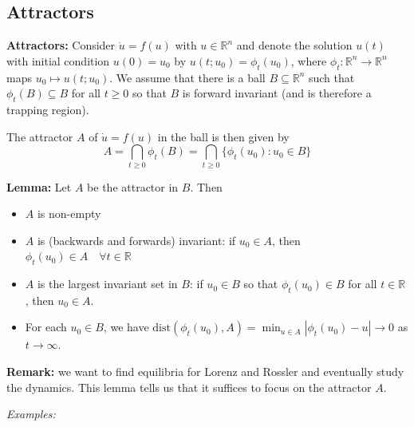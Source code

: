 \documentclass[12pt]{report}
\newcommand{\R}{\mathbb{R}}
\newcommand{\abs}[1]{\left\vert #1 \right\vert}
\newcommand{\sub}{\subseteq}
\newcommand*{\tbf}[1]{\ifmmode\mathbf{#1}\else\textbf{#1}\fi}
\newenvironment{proposition}[1][gray]{
\begin{tcolorbox}[
    parbox=false,
    colback=#1!5!white,
    colframe=#1!75!black,
    breakable
]}
{\end{tcolorbox}}
\begin{document}
\subsection{Attractors}
\tbf{Attractors:} Consider $\dot u = f(u)$ with $u \in \R^n$ and denote the solution $u(t)$ with initial condition $u(0) = u_0$ by $u(t; u_0) = \phi_t(u_0)$, where $\phi_t: \R^n \to \R^n$ maps $u_0 \mapsto u(t; u_0)$. We assume that there is a ball $B \sub \R^n$ such that $\phi_t(B) \sub B$ for all $t \geq 0$ so that $B$ is forward invariant (and is therefore a trapping region).

The attractor $A$ of $\dot u = f(u)$ in the ball is then given by
\[A = \bigcap_{t \geq 0} \phi_t(B) = \bigcap_{t \geq 0} \{\phi_t(u_0): u_0 \in B\}\]

\begin{proposition}
    \textbf{Lemma:} Let $A$ be the attractor in $B$. Then
    \begin{itemize}
        \item $A$ is non-empty
        \item $A$ is (backwards and forwards) invariant: if $u_0 \in A$, then $\phi_t(u_0) \in A \quad \forall t \in \R$
        \item $A$ is the largest invariant set in $B$: if $u_0 \in B$ so that $\phi_t(u_0) \in B$ for all $t \in \R$, then $u_0 \in A$.
        \item For each $u_0 \in B$, we have $\text{dist}(\phi_t(u_0), A) = \min_{u \in A} \abs{\phi_t(u_0) - u} \to 0$ as $t \to \infty$.
    \end{itemize}
\end{proposition}

\tbf{Remark:} we want to find equilibria for Lorenz and Rossler and eventually study the dynamics. This lemma tells us that it suffices to focus on the attractor $A$.

\emph{Examples:}
\end{document}
